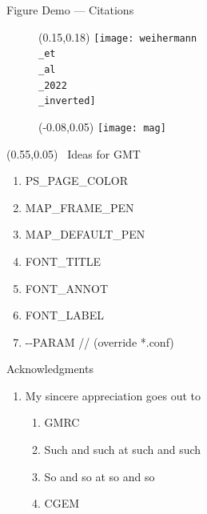\documentclass[dark]{cgem-presentation}
\begin{document}
  \begin{frame}{Figure Demo --- Citations}
    \begin{figure}
      \begin{textblock*}{0.7\paperwidth}(0.15\paperwidth,0.18\paperheight)
        \texttt{[image: weihermann\\\_et\\\_al\\\_2022\\\_inverted]}
      \end{textblock*}
    \end{figure}
  \end{frame}

  \begin{frame}
    \begin{figure}
      \begin{textblock*}{0.7\paperwidth}(-0.08\paperwidth,0.05\paperheight)
        \texttt{[image: mag]}
      \end{textblock*}
    \end{figure}
    \begin{textblock*}{0.5\paperwidth}(0.55\paperwidth,0.05\paperheight)
      \Huge
      \,\,\,Ideas for GMT
      \begin{enumerate}
        \item PS\_PAGE\_COLOR
        \item MAP\_FRAME\_PEN
        \item MAP\_DEFAULT\_PEN
        \item FONT\_TITLE
        \item FONT\_ANNOT
        \item FONT\_LABEL
        \item -\hspace{0.1mm}-PARAM //
          (override *.conf)
      \end{enumerate}
    \end{textblock*}

  \end{frame}

  \begin{frame}{Acknowledgments}
    \vspace{-2cm}
    \begin{enumerate}
      \item My sincere appreciation goes out to
      \begin{enumerate}
        \item GMRC
        \item Such and such at such and such
        \item So and so at so and so
        \item CGEM 
      \end{enumerate}
    \end{enumerate}
  \end{frame}
\end{document}
